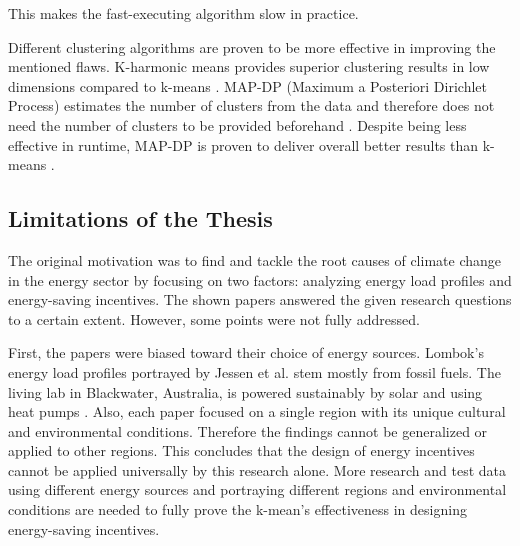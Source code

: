 \begin{description}
    This makes the fast-executing algorithm slow in practice.
\end{description}

Different clustering algorithms are proven to be more effective in improving the mentioned flaws.
K-harmonic means provides superior clustering results in low dimensions compared to k-means \cite{HAM-ALT}.
MAP-DP (Maximum a Posteriori Dirichlet Process) estimates the number of clusters from the data and therefore does not need the number of clusters to be provided beforehand \cite{RAY-ALT}.
Despite being less effective in runtime, MAP-DP is proven to deliver overall better results than k-means \cite{RAY-ALT}.

\subsection{Limitations of the Thesis}
The original motivation was to find and tackle the root causes of climate change in the energy sector by focusing on two factors: analyzing energy load profiles and energy-saving incentives.
The shown papers answered the given research questions to a certain extent.
However, some points were not fully addressed.

First, the papers were biased toward their choice of energy sources.
Lombok's energy load profiles portrayed by Jessen et al. \cite{JES-IND} stem mostly from fossil fuels.
The living lab in Blackwater, Australia, is powered sustainably by solar and using heat pumps \cite{MAL-HBP}.
Also, each paper focused on a single region with its unique cultural and environmental conditions.
Therefore the findings cannot be generalized or applied to other regions.
This concludes that the design of energy incentives cannot be applied universally by this research alone.
More research and test data using different energy sources and portraying different regions and environmental conditions are needed to fully prove the k-mean's effectiveness in designing energy-saving incentives. 


